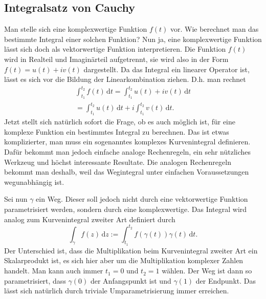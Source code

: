 \documentclass[a4paper,10pt,fleqn,twocolumn,twoside]{article}
\begin{document}
\subsection{Integralsatz von Cauchy}

Man stelle sich eine komplexwertige Funktion $f(t)$ vor.
Wie berechnet man das bestimmte Integral einer solchen Funktion?
Nun ja, eine komplexwertige Funktion lässt sich doch als vektorwertige
Funktion interpretieren. Die Funktion $f(t)$ wird in Realteil und
Imaginärteil aufgetrennt, sie wird also in der Form
$f(t)=u(t)+iv(t)$ dargestellt.
Da das Integral ein linearer Operator ist,
lässt es sich vor die Bildung der Linearkombination ziehen.
D.h. man rechnet
\begin{gather*}
\int_{t_1}^{t_2} f(t)\,\mathrm dt
= \int_{t_1}^{t_2} u(t)+iv(t)\,\mathrm dt\\
= \int_{t_1}^{t_2} u(t)\,\mathrm dt + i\int_{t_1}^{t_2}
v(t)\,\mathrm dt.
\end{gather*}
Jetzt stellt sich natürlich sofort die Frage, ob es auch möglich ist,
für eine komplexe Funktion ein bestimmtes Integral zu berechnen.
Das ist etwas komplizierter, man muss ein sogenanntes komplexes
Kurvenintegral definieren. Dafür bekommt man jedoch einfache analoge
Rechenregeln, ein sehr nützliches Werkzeug und höchst interessante
Resultate. Die analogen Rechenregeln bekommt man deshalb,
weil das Wegintegral unter einfachen Voraussetzungen
wegunabhängig ist.

Sei nun $\gamma$ ein Weg. Dieser soll jedoch nicht durch eine
vektorwertige Funktion parametrisiert werden, sondern durch
eine komplexwertige. Das Integral wird analog zum Kurvenintegral
zweiter Art definiert durch
\[\int_\gamma f(z)\,\mathrm dz
:= \int_{t_1}^{t_2} f(\gamma(t))\gamma(t)\,\mathrm dt.\]
Der Unterschied ist, dass die Multiplikation beim Kurvenintegral
zweiter Art ein Skalarprodukt ist, es sich hier aber um die
Multiplikation komplexer Zahlen handelt.
Man kann auch immer $t_1=0$ und $t_2=1$ wählen.
Der Weg ist dann so parametrisiert, dass $\gamma(0)$
der Anfangspunkt ist und $\gamma(1)$ der Endpunkt. Das lässt
sich natürlich durch triviale Umparametrisierung immer erreichen.
\end{document}
